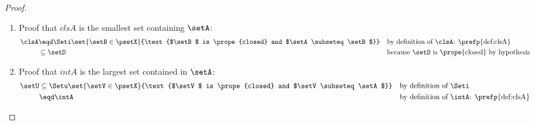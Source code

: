 \begin{proof}
\begin{enumerate}
  \item Proof that $clsA$ is the smallest  set containing   $\setA$:
    \begin{align*}
      \clsA
        &\eqd \Seti\set{\setB\in\psetX}{\text{$\setB$ is \prope{closed} and $\setA\subseteq\setB$}}
        &&    \text{by definition of $\clsA$: \prefp{def:clsA}}
      \\&\subseteq \setD
        &&    \text{because $\setD$ is \prope{closed} by hypothesis}
    \end{align*}

  \item Proof that $intA$ is the largest     set contained in $\setA$:
    \begin{align*}
      \setU
        &\subseteq \Setu\set{\setV\in\psetX}{\text{$\setV$ is \prope{closed} and $\setV\subseteq\setA$}}
        &&         \text{by definition of $\Seti$}
      \\&\eqd      \intA
        &&    \text{by definition of $\intA$: \prefp{def:clsA}}
    \end{align*}
\end{enumerate}
\end{proof}



